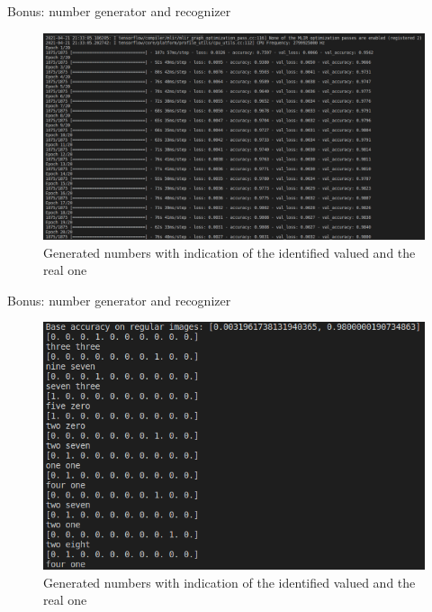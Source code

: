 \documentclass[8pt]{beamer}
\begin{document}
\begin{frame}{Bonus: number generator and recognizer}
\begin{figure} 
    \includegraphics[scale=0.244]{images/immagini_matrix/step_matrix_computation.png}
    \vspace*{-5mm}
    \caption{Generated numbers with indication of the identified valued and the real one}
\end{figure}
\end{frame}

\begin{frame}{Bonus: number generator and recognizer}
\begin{figure} 
    \includegraphics[scale=0.3]{images/immagini_matrix/valori_numeri_matrice.png}
    \vspace*{0mm}
    \caption{Generated numbers with indication of the identified valued and the real one}
\end{figure}
\end{frame}
\end{document}
